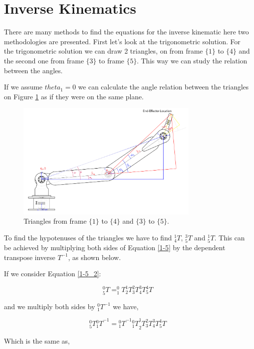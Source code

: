 \documentclass[transmag]{IEEEtran}
\begin{document}
\section{Inverse Kinematics}

There are many methods to find the equations for the inverse kinematic here two methodologies are presented. First let's look at the trigonometric solution. For the trigonometric solution we can draw 2 triangles, on from frame $\{1\}$ to $\{4\}$ and the second one from frame $\{3\}$ to frame $\{5\}$. This way we can study the relation between the angles. 

If we assume $theta_1 = 0$ we can calculate the angle relation between the triangles on Figure \ref{Inverse_triangles} as if they were on the same plane.

\begin{figure}[h]
\centerline{\includegraphics[width=3.5in]{./images/Inverse_triang}}
\caption{Triangles from frame $\{1\}$ to $\{4\}$ and $\{3\}$ to $\{5\}$.\label{Inverse_triangles}}
\end{figure}

To find the hypotenuses of the triangles we have to find $^1_4T$, $^3_5T$ and $^1_5T$. This can be achieved by multiplying both sides of Equation \ref{1-5} by the dependent transpose inverse $T^{-1}$, as shown below.

If we consider Equation \ref{1-5_2}:

\begin{equation}
^0_5T = ^0_1T  ^1_2T  ^2_3T  ^3_4T  ^4_5T
\label{1-5_2}
\end{equation}

and we multiply both sides by $^0_1T^{-1}$ we have,

\begin{equation}
^0_5T {^0_1T}^{-1} = {^0_1T}^{-1} {^0_1T} ^1_2T  ^2_3T  ^3_4T  ^4_5T
\end{equation}

Which is the same as,
\end{document}
